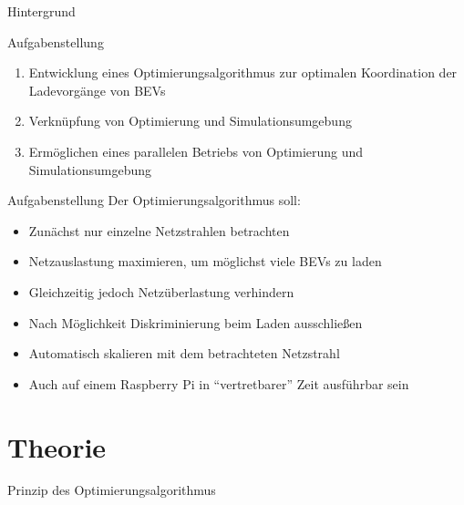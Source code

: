 \documentclass[aspectratio=169]{beamer}
\begin{document}
\begin{frame}{Hintergrund}
	\begin{figure}
		\centering
		
	\end{figure}
\end{frame}


\begin{frame}{Aufgabenstellung}
	\begin{enumerate}[<+->]
		\item Entwicklung eines Optimierungsalgorithmus zur optimalen 
		Koordination der Ladevorgänge von BEVs
		\item Verknüpfung von Optimierung und Simulationsumgebung
		\item Ermöglichen eines parallelen Betriebs von Optimierung und
		Simulationsumgebung
	\end{enumerate}
\end{frame}


\begin{frame}{Aufgabenstellung}
	Der Optimierungsalgorithmus soll:
	\begin{itemize}[<+(1)->]
		\item Zunächst nur einzelne Netzstrahlen betrachten
		\item Netzauslastung maximieren, um möglichst viele BEVs zu laden
		\item Gleichzeitig jedoch Netzüberlastung verhindern
		\item Nach Möglichkeit Diskriminierung beim Laden ausschließen
		\item Automatisch skalieren mit dem betrachteten Netzstrahl
		\item Auch auf einem Raspberry Pi in \enquote{vertretbarer} Zeit 
		ausführbar sein
	\end{itemize}
	
\end{frame}

\section{Theorie}

\begin{frame}{Prinzip des Optimierungsalgorithmus}
	\begin{figure}
		\centering
		
	\end{figure}
\end{frame}
\end{document}
